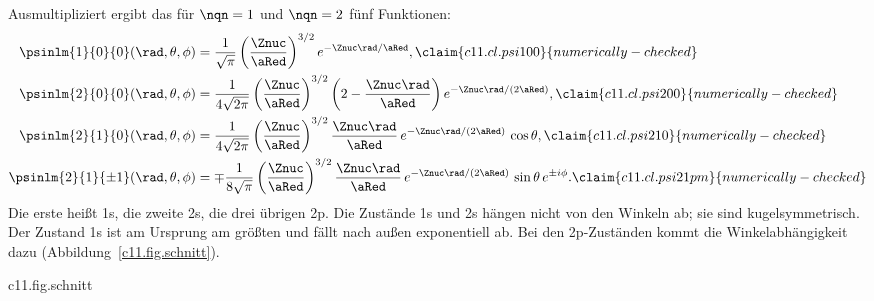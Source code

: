 
Ausmultipliziert ergibt das für $\nqn = 1$ und $\nqn = 2$ fünf Funktionen:
\begin{align}
  \psinlm{1}{0}{0}(\rad, \theta, \phi) &= \frac{1}{\sqrt{\pi}}
    \left(\frac{\Znuc}{\aRed}\right)^{3/2} e^{-\Znuc\rad/\aRed},
    \label{c11.eq.psi100}\claim{c11.cl.psi100}{numerically-checked} \\
  \psinlm{2}{0}{0}(\rad, \theta, \phi) &= \frac{1}{4\sqrt{2\pi}}
    \left(\frac{\Znuc}{\aRed}\right)^{3/2}
    \left(2 - \frac{\Znuc\rad}{\aRed}\right) e^{-\Znuc\rad/(2\aRed)},
    \label{c11.eq.psi200}\claim{c11.cl.psi200}{numerically-checked} \\
  \psinlm{2}{1}{0}(\rad, \theta, \phi) &= \frac{1}{4\sqrt{2\pi}}
    \left(\frac{\Znuc}{\aRed}\right)^{3/2}
    \frac{\Znuc\rad}{\aRed}\,e^{-\Znuc\rad/(2\aRed)}\,\cos\theta,
    \label{c11.eq.psi210}\claim{c11.cl.psi210}{numerically-checked} \\
  \psinlm{2}{1}{\pm 1}(\rad, \theta, \phi) &= \mp\frac{1}{8\sqrt{\pi}}
    \left(\frac{\Znuc}{\aRed}\right)^{3/2}
    \frac{\Znuc\rad}{\aRed}\,e^{-\Znuc\rad/(2\aRed)}\,\sin\theta\,e^{\pm i\phi}.
    \label{c11.eq.psi21pm}\claim{c11.cl.psi21pm}{numerically-checked}
\end{align}
Die erste heißt 1s, die zweite 2s, die drei übrigen 2p. Die Zustände 1s und 2s hängen
nicht von den Winkeln ab; sie sind kugelsymmetrisch. Der Zustand 1s ist am Ursprung
am größten und fällt nach außen exponentiell ab. Bei den 2p-Zuständen kommt die
Winkelabhängigkeit dazu (Abbildung~\ref{c11.fig.schnitt}).

\begin{tpcfigure}{c11.fig.schnitt}
  \caption{Die Dichte $\abs{\psi}^2$ der Relativkoordinate für die 2p-Zustände, als
    Schnitt durch die Ebene $y = 0$ und für $\Znuc = 1$; dunkler heißt größer, beide
    Felder benutzen dieselbe lineare Grauskala. Links $\psinlm{2}{1}{0}$: zwei Keulen
    entlang der $z$-Achse, getrennt durch die Ebene $z = 0$, in der die Dichte
    verschwindet. Rechts $\psinlm{2}{1}{\pm 1}$: Im Raum ist das ein Ring um die
    $z$-Achse, auf der die Dichte verschwindet; der Schnitt trifft den Ring zweimal. Die
    Achsen sind Komponenten von $\posRel = \posE - \posP$, nicht Orte im Labor.}
\end{tpcfigure}

